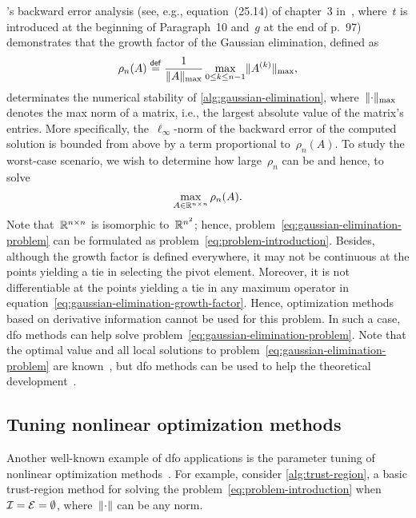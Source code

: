 's backward error analysis (see, e.g., equation~(25.14) of chapter~3 in~\cite{Wilkinson_1963}, where~$t$ is introduced at the beginning of Paragraph~10 and~$g$ at the end of p.~97) demonstrates that the growth factor of the Gaussian elimination, defined as
\begin{equation}
    \label{eq:gaussian-elimination-growth-factor}
    \rho_n(A) \mathrel{\stackrel{\mathsf{def}}{=}} \frac{1}{\lVert A\rVert_{\max}} \max_{0 \le k \le n - 1} \lVert A^{(k)}\rVert_{\max},
\end{equation}
%
determinates the numerical stability of \cref{alg:gaussian-elimination}, where~$\lVert\cdot\rVert_{\max}$ denotes the max norm of a matrix, i.e., the largest absolute value of the matrix's entries.
More specifically, the~$\ell_{\infty}$-norm of the backward error of the computed solution is bounded from above by a term proportional to~$\rho_n(A)$.
To study the worst-case scenario, we wish to determine how large~$\rho_n$ can be and hence, to solve
\begin{equation}
    \label{eq:gaussian-elimination-problem}
    \max_{A \in \mathbb{R}^{n \times n}} \rho_n(A).
\end{equation}
Note that~$\mathbb{R}^{n \times n}$ is isomorphic to~$\mathbb{R}^{n^2}$; hence, problem~\cref{eq:gaussian-elimination-problem} can be formulated as problem~\cref{eq:problem-introduction}.
Besides, although the growth factor is defined everywhere, it may not be continuous at the points yielding a tie in selecting the pivot element.
Moreover, it is not differentiable at the points yielding a tie in any maximum operator in equation~\cref{eq:gaussian-elimination-growth-factor}.
Hence, optimization methods based on derivative information cannot be used for this problem.
In such a case, \gls{dfo} methods can help solve problem~\cref{eq:gaussian-elimination-problem}.
Note that the optimal value and all local solutions to problem~\cref{eq:gaussian-elimination-problem} are known~\cite{Higham_Higham_1989}, but \gls{dfo} methods can be used to help the theoretical development~\cite{Higham_1993}.

\subsection{Tuning nonlinear optimization methods}
\label{subsec:tuning-nonlinear-optimization-methods}

Another well-known example of \gls{dfo} applications is the parameter tuning of nonlinear optimization methods~\cite{Audet_Orban_2006}.
For example, consider \cref{alg:trust-region}, a basic trust-region method for solving the problem~\cref{eq:problem-introduction} when~$\mathcal{I} = \mathcal{E} = \emptyset$, where~$\lVert\cdot\rVert$ can be any norm.

